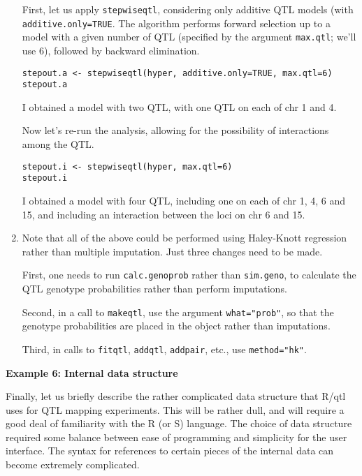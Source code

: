 \documentclass[10pt,letterpaper]{article}
\newcommand{\usercolor}{\color [named]{BlueViolet}}
\begin{document}
\begin{enumerate}
  First, let us apply \verb-stepwiseqtl-, considering only additive
  QTL models (with \verb-additive.only=TRUE-.  The algorithm performs
  forward selection up to a model with a given number of QTL
  (specified by the argument \verb-max.qtl-; we'll use 6), followed by
  backward elimination.

\usercolor
\verb|stepout.a <- stepwiseqtl(hyper, additive.only=TRUE, max.qtl=6)| \\
\verb|stepout.a|
\normalcolor

   I obtained a model with two QTL, with one QTL on each of chr 1 and
   4.

   Now let's re-run the analysis, allowing for the possibility of
   interactions among the QTL.

\usercolor
\verb|stepout.i <- stepwiseqtl(hyper, max.qtl=6)| \\
\verb|stepout.i|
\normalcolor

  I obtained a model with four QTL, including one on each of chr 1,
  4, 6 and 15, and including an interaction between the loci on chr 6
  and 15. 

\item Note that all of the above could be performed using
  Haley-Knott regression rather than multiple imputation.  Just three
  changes need to be made.  

  First, one needs to run
  \verb-calc.genoprob- rather than \verb-sim.geno-, to calculate the
  QTL genotype probabilities rather than perform imputations.

  Second, in a call to \verb-makeqtl-, use the argument
  \verb-what="prob"-, so that the genotype probabilities are placed in
  the object rather than imputations.

  Third, in calls to \verb-fitqtl-, \verb-addqtl-, \verb-addpair-,
  etc., use \verb-method="hk"-.

\end{enumerate}




\newpage
\noindent \textbf{Example 6: Internal data structure} \vspace{6pt}
\nopagebreak

\label{example6}

\noindent Finally, let us briefly describe the rather complicated data
structure that R/qtl uses for QTL mapping experiments.  This will be
rather dull, and will require a good deal of familiarity with the R
(or S) language.  The choice of data structure required some balance
between ease of programming and simplicity for the user interface.
The syntax for references to certain pieces of the internal data can
become extremely complicated.
\end{document}
